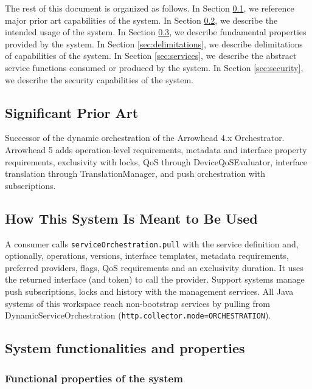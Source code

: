 \documentclass[a4paper]{arrowhead}
\begin{document}
The rest of this document is organized as follows.
In Section \ref{sec:prior_art}, we reference major prior art capabilities of the system.
In Section \ref{sec:use}, we describe the intended usage of the system.
In Section \ref{sec:properties}, we describe fundamental properties provided by the system.
In Section \ref{sec:delimitations}, we describe delimitations of capabilities of the system.
In Section \ref{sec:services}, we describe the abstract service functions consumed or produced by the system.
In Section \ref{sec:security}, we describe the security capabilities of the system.

\newpage

\subsection{Significant Prior Art}
\label{sec:prior_art}

Successor of the dynamic orchestration of the Arrowhead 4.x Orchestrator. Arrowhead 5 adds operation-level requirements, metadata and interface property requirements, exclusivity with locks, QoS through Device\allowbreak{}Qo\allowbreak{}SEvaluator, interface translation through Translation\allowbreak{}Manager, and push orchestration with subscriptions.

\subsection{How This System Is Meant to Be Used}
\label{sec:use}

A consumer calls \texttt{service\allowbreak{}Orchestration.\allowbreak{}pull} with the service definition and, optionally, operations, versions, interface templates, metadata requirements, preferred providers, flags, QoS requirements and an exclusivity duration. It uses the returned interface (and token) to call the provider. Support systems manage push subscriptions, locks and history with the management services. All Java systems of this workspace reach non-bootstrap services by pulling from Dynamic\allowbreak{}Service\allowbreak{}Orchestration (\texttt{http.\allowbreak{}collector.\allowbreak{}mode=\allowbreak{}ORCHESTRATION}).

\subsection{System functionalities and properties}
\label{sec:properties}

\subsubsection{Functional properties of the system}
\end{document}

